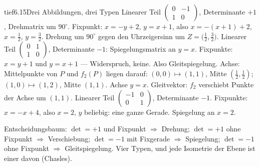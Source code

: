 \begin{loesungkarte}{tief}{6.15}{Drei Abbildungen, drei Typen}
Linearer Teil $\begin{pmatrix}0 & -1\\ 1 & 0\end{pmatrix}$, Determinante $+1$, Drehmatrix um $90^{\circ}$. Fixpunkt: $x = -y + 2$, $y = x + 1$, also $x = -(x + 1) + 2$, $x = \frac12$, $y = \frac32$. Drehung um $90^{\circ}$ gegen den Uhrzeigersinn um $Z = \bigl(\frac12, \frac32\bigr)$.
Linearer Teil $\begin{pmatrix}0 & 1\\ 1 & 0\end{pmatrix}$, Determinante $-1$: Spiegelungsmatrix an $y = x$. Fixpunkte: $x = y + 1$ und $y = x + 1$ --- Widerspruch, keine. Also Gleitspiegelung. Achse: Mittelpunkte von $P$ und $f_2(P)$ liegen darauf: $(0, 0)\mapsto(1, 1)$, Mitte $(\frac12, \frac12)$; $(1, 0)\mapsto(1, 2)$, Mitte $(1, 1)$. Achse $y = x$. Gleitvektor: $f_2$ verschiebt Punkte der Achse um $(1, 1)$.
Linearer Teil $\begin{pmatrix}-1 & 0\\ 0 & 1\end{pmatrix}$, Determinante $-1$. Fixpunkte: $x = -x + 4$, also $x = 2$, $y$ beliebig: eine ganze Gerade. Spiegelung an $x = 2$.
\begin{mitnehmen}\kastentext
Entscheidungsbaum: $\det = +1$ und Fixpunkt $\Rightarrow$ Drehung; $\det = +1$ ohne Fixpunkt $\Rightarrow$ Verschiebung; $\det = -1$ mit Fixgerade $\Rightarrow$ Spiegelung; $\det = -1$ ohne Fixpunkt $\Rightarrow$ Gleitspiegelung. Vier Typen, und jede Isometrie der Ebene ist einer davon (Chasles).
\end{mitnehmen}
\end{loesungkarte}

